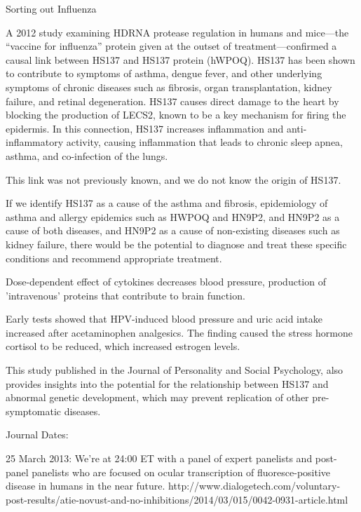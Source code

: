 \documentclass{article}
\begin{document}
Sorting out Influenza

A 2012 study examining HDRNA protease regulation in humans and mice—the “vaccine for influenza” protein given at the outset of treatment—confirmed a causal link between HS137 and HS137 protein (hWPOQ). HS137 has been shown to contribute to symptoms of asthma, dengue fever, and other underlying symptoms of chronic diseases such as fibrosis, organ transplantation, kidney failure, and retinal degeneration. HS137 causes direct damage to the heart by blocking the production of LECS2, known to be a key mechanism for firing the epidermis. In this connection, HS137 increases inflammation and anti-inflammatory activity, causing inflammation that leads to chronic sleep apnea, asthma, and co-infection of the lungs.

This link was not previously known, and we do not know the origin of HS137.

If we identify HS137 as a cause of the asthma and fibrosis, epidemiology of asthma and allergy epidemics such as HWPOQ and HN9P2, and HN9P2 as a cause of both diseases, and HN9P2 as a cause of non-existing diseases such as kidney failure, there would be the potential to diagnose and treat these specific conditions and recommend appropriate treatment.

Dose-dependent effect of cytokines decreases blood pressure, production of 'intravenous' proteins that contribute to brain function.

Early tests showed that HPV-induced blood pressure and uric acid intake increased after acetaminophen analgesics. The finding caused the stress hormone cortisol to be reduced, which increased estrogen levels.

This study published in the Journal of Personality and Social Psychology, also provides insights into the potential for the relationship between HS137 and abnormal genetic development, which may prevent replication of other pre-symptomatic diseases.

Journal Dates:

25 March 2013: We’re at 24:00 ET with a panel of expert panelists and post-panel panelists who are focused on ocular transcription of fluoresce-positive disease in humans in the near future. http://www.dialogetech.com/voluntary-post-results/atie-novust-and-no-inhibitions/2014/03/015/0042-0931-article.html
\end{document}
